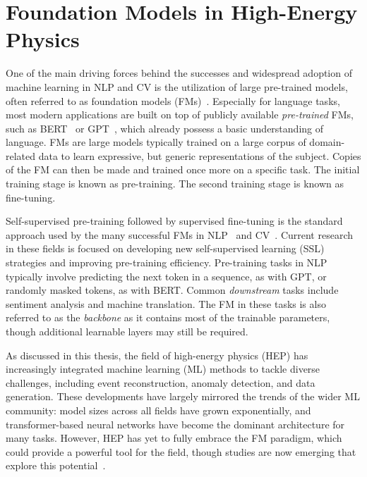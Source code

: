 \chapter{Foundation Models in High-Energy Physics}
\label{ch:foundation_models}

One of the main driving forces behind the successes and widespread adoption of machine learning in NLP and CV is the utilization of large pre-trained models, often referred to as foundation models (FMs)~\cite{OpportunitiesRisksFoundation}.
Especially for language tasks, most modern applications are built on top of publicly available \textit{pre-trained} FMs, such as BERT~\cite{BERT} or GPT~\cite{GPT, GPT2}, which already possess a basic understanding of language.
FMs are large models typically trained on a large corpus of domain-related data to learn expressive, but generic representations of the subject.
Copies of the FM can then be made and trained once more on a specific task.
The initial training stage is known as pre-training.
The second training stage is known as fine-tuning.

Self-supervised pre-training followed by supervised fine-tuning is the standard approach used by the many successful FMs in NLP~\cite{BERT, GPT, GPT2, BART, LanguageModelsAre} and CV~\cite{DINO, Dalle, Flamingo, MAE, BEIT, IJepa}.
Current research in these fields is focused on developing new self-supervised learning (SSL) strategies and improving pre-training efficiency.
Pre-training tasks in NLP typically involve predicting the next token in a sequence, as with GPT, or randomly masked tokens, as with BERT.
Common \textit{downstream} tasks include sentiment analysis and machine translation. The FM in these tasks is also referred to as the \textit{backbone} as it contains most of the trainable parameters, though additional learnable layers may still be required.

As discussed in this thesis, the field of high-energy physics (HEP) has increasingly integrated machine learning (ML) methods to tackle diverse challenges, including event reconstruction, anomaly detection, and data generation.
These developments have largely mirrored the trends of the wider ML community: model sizes across all fields have grown exponentially, and transformer-based neural networks have become the dominant architecture for many tasks.
However, HEP has yet to fully embrace the FM paradigm, which could provide a powerful tool for the field, though studies are now emerging that explore this potential~\cite{MPM, MPM2, ReSim, JapanPretrain, Omnijet, Omnilearn, LargeScalePretraining, JetCLR}.

